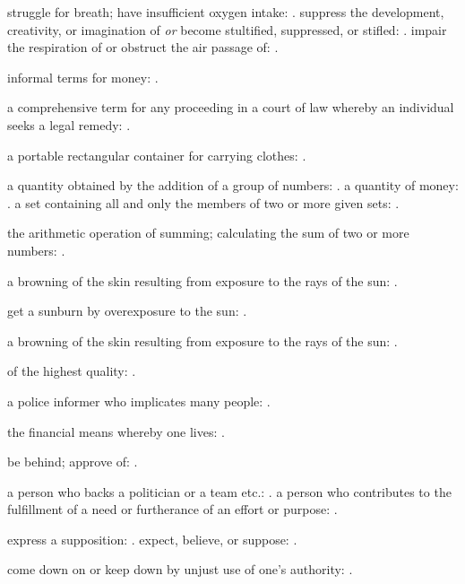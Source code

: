   struggle for breath; have insufficient oxygen intake: . suppress the development, creativity, or imagination of \textit{or} become stultified, suppressed, or stifled: . impair the respiration of or obstruct the air passage of: .

  informal terms for money: .

  a comprehensive term for any proceeding in a court of law whereby an individual seeks a legal remedy: .

  a portable rectangular container for carrying clothes: .

  a quantity obtained by the addition of a group of numbers: . a quantity of money: . a set containing all and only the members of two or more given sets: .

  the arithmetic operation of summing; calculating the sum of two or more numbers: .

  a browning of the skin resulting from exposure to the rays of the sun: .

  get a sunburn by overexposure to the sun: .

  a browning of the skin resulting from exposure to the rays of the sun: .

  of the highest quality: .

  a police informer who implicates many people: .

  the financial means whereby one lives: .

  be behind; approve of: .

  a person who backs a politician or a team etc.: . a person who contributes to the fulfillment of a need or furtherance of an effort or purpose: .

  express a supposition: . expect, believe, or suppose: .

  come down on or keep down by unjust use of one's authority: .

